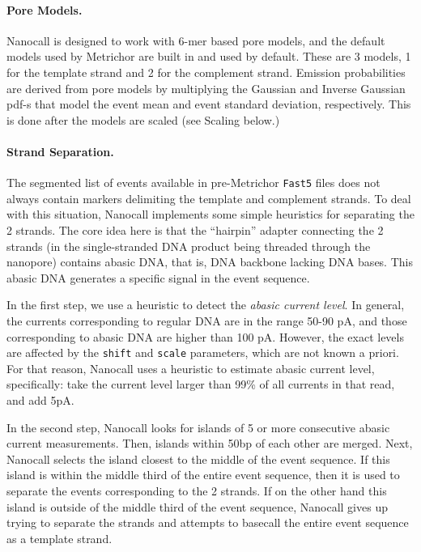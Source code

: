 \documentclass{bioinfo}
\begin{document}
\begin{methods}
\paragraph{Pore Models.}
Nanocall is designed to work with 6-mer based pore models, and the default models used by Metrichor are built in and used by default. These are 3 models, 1 for the template strand and 2 for the complement strand. Emission probabilities are derived from pore models by multiplying the Gaussian and Inverse Gaussian pdf-s that model the event mean and event standard deviation, respectively. This is done after the models are scaled (see Scaling below.)

\paragraph{Strand Separation.}
The segmented list of events available in pre-Metrichor \texttt{Fast5} files does not always contain markers delimiting the template and complement strands. To deal with this situation, Nanocall implements some simple heuristics for separating the 2 strands. The core idea here is that the ``hairpin'' adapter connecting the 2 strands (in the single-stranded DNA product being threaded through the nanopore) contains abasic DNA, that is, DNA backbone lacking DNA bases. This abasic DNA generates a specific signal in the event sequence.

In the first step, we use a heuristic to detect the \emph{abasic current level}. In general, the currents corresponding to regular DNA are in the range 50-90 pA, and those corresponding to abasic DNA are higher than 100 pA. However, the exact levels are affected by the \texttt{shift} and \texttt{scale} parameters, which are not known a priori. For that reason, Nanocall uses a heuristic to estimate abasic current level, specifically: take the current level larger than 99\% of all currents in that read, and add 5pA.

In the second step, Nanocall looks for islands of 5 or more consecutive abasic current measurements. Then, islands within 50bp of each other are merged. Next, Nanocall selects the island closest to the middle of the event sequence. If this island is within the middle third of the entire event sequence, then it is used to separate the events corresponding to the 2 strands. If on the other hand this island is outside of the middle third of the event sequence, Nanocall gives up trying to separate the strands and attempts to basecall the entire event sequence as a template strand.


\end{methods}
\end{document}
